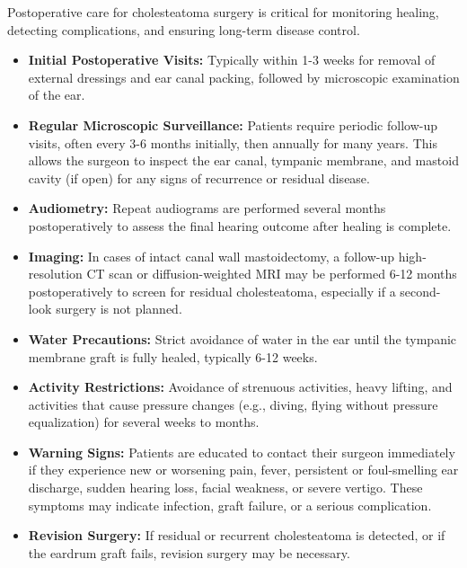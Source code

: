 Postoperative care for cholesteatoma surgery is critical for monitoring healing, detecting complications, and ensuring long-term disease control.

\begin{itemize}
  \item \textbf{Initial Postoperative Visits:} Typically within 1-3 weeks for removal of external dressings and ear canal packing, followed by microscopic examination of the ear.
  
  \item \textbf{Regular Microscopic Surveillance:} Patients require periodic follow-up visits, often every 3-6 months initially, then annually for many years. This allows the surgeon to inspect the ear canal, tympanic membrane, and mastoid cavity (if open) for any signs of recurrence or residual disease.
  
  \item \textbf{Audiometry:} Repeat audiograms are performed several months postoperatively to assess the final hearing outcome after healing is complete.
  
  \item \textbf{Imaging:} In cases of intact canal wall mastoidectomy, a follow-up high-resolution CT scan or diffusion-weighted MRI may be performed 6-12 months postoperatively to screen for residual cholesteatoma, especially if a second-look surgery is not planned.
  
  \item \textbf{Water Precautions:} Strict avoidance of water in the ear until the tympanic membrane graft is fully healed, typically 6-12 weeks.
  
  \item \textbf{Activity Restrictions:} Avoidance of strenuous activities, heavy lifting, and activities that cause pressure changes (e.g., diving, flying without pressure equalization) for several weeks to months.
  
  \item \textbf{Warning Signs:} Patients are educated to contact their surgeon immediately if they experience new or worsening pain, fever, persistent or foul-smelling ear discharge, sudden hearing loss, facial weakness, or severe vertigo. These symptoms may indicate infection, graft failure, or a serious complication.
  
  \item \textbf{Revision Surgery:} If residual or recurrent cholesteatoma is detected, or if the eardrum graft fails, revision surgery may be necessary.
\end{itemize}

